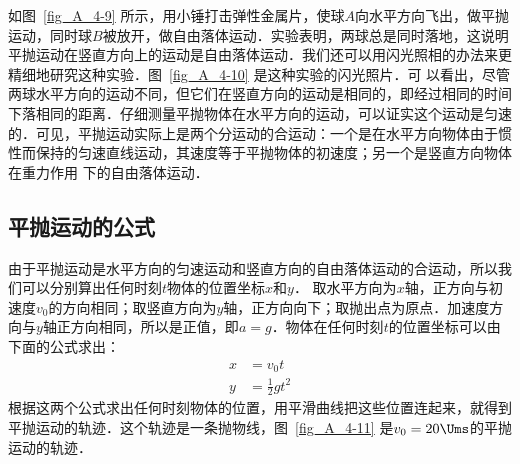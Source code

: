 如图~\ref{fig_A_4-9} 所示，用小锤打击弹性金属片，使球$A$向水平方向飞出，做平抛运动，同时球$B$被放开，做自由落体运动．实验表明，两球总是同时落地，这说明平抛运动在竖直方向上的运动是自由落体运动．我们还可以用闪光照相的办法来更精细地研究这种实验．图~\ref{fig_A_4-10} 是这种实验的闪光照片．可
以看出，尽管两球水平方向的运动不同，但它们在竖直方向的运动是相同的，即经过相同的时间下落相同的距离．仔细测量平抛物体在水平方向的运动，可以证实这个运动是匀速的．可见，平抛运动实际上是两个分运动的合运动：一个是在水平方向物体由于惯性而保持的匀速直线运动，其速度等于平抛物体的初速度；另一个是竖直方向物体在重力作用
下的自由落体运动．


\subsection{平抛运动的公式} 

由于平抛运动是水平方向的匀速运动和竖直方向的自由落体运动的合运动，所以我们可以分别算出任何时刻$t$物体的位置坐标$x$和$y$．
取水平方向为$x$轴，正方向与初速度$v_0$的方向相同；取竖直方向为$y$轴，正方向向下；取抛出点为原点．加速度方向与$y$轴正方向相同，所以是正值，即$a=g$．物体在任何时刻$t$的位置坐标可以由下面的公式求出：
\[\begin{split}
x&=v_0 t\\
y&=\frac{1}{2}gt^2
\end{split} \]
根据这两个公式求出任何时刻物体的位置，用平滑曲线把这些位置连起来，就得到平抛运动的轨迹．这个轨迹是一条抛物线，图~\ref{fig_A_4-11} 是$v_0=20\Ums$的平抛运动的轨迹．


